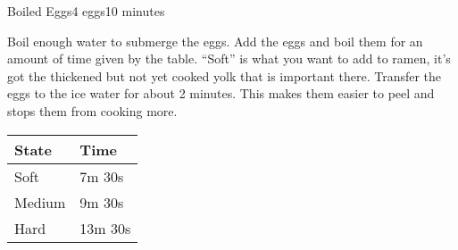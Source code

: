 \documentclass[../Cookbook.tex]{subfiles}
\begin{document}
\begin{recipe}[BoiledEggs]{Boiled Eggs}{4 eggs}{10 minutes}
	\begin{minipage}{0.6\textwidth}
		Boil enough water to submerge the eggs.
		Add the eggs and boil them for an amount of time given by the table.
		``Soft'' is what you want to add to ramen, it's got the thickened but not yet cooked yolk that is important there.
		Transfer the eggs to the ice water for about 2 minutes. This makes them easier to peel and stops them from cooking more.
	\end{minipage}
	\begin{minipage}{0.39\textwidth}
		\begin{tabular}{ll}
			\textbf{State} & \textbf{Time} \\ \hline
			Soft & 7m 30s \\
			Medium & 9m 30s \\
			Hard & 13m 30s
		\end{tabular}
	\end{minipage}
\end{recipe}
\end{document}
